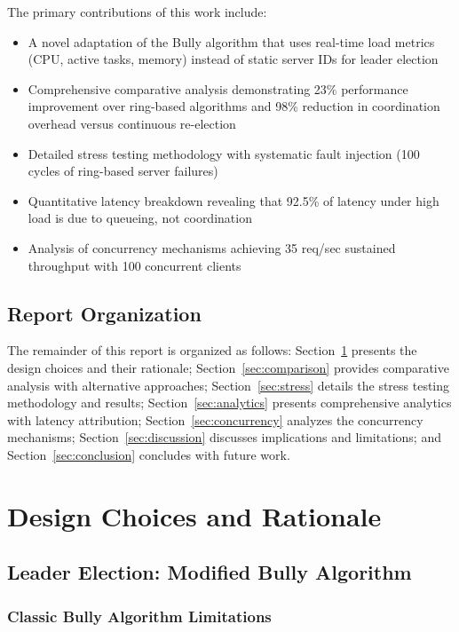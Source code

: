 \documentclass[12pt,a4paper]{article}
\begin{document}
The primary contributions of this work include:

\begin{itemize}[leftmargin=*]
    \item A novel adaptation of the Bully algorithm that uses real-time load metrics (CPU, active tasks, memory) instead of static server IDs for leader election
    \item Comprehensive comparative analysis demonstrating 23\% performance improvement over ring-based algorithms and 98\% reduction in coordination overhead versus continuous re-election
    \item Detailed stress testing methodology with systematic fault injection (100 cycles of ring-based server failures)
    \item Quantitative latency breakdown revealing that 92.5\% of latency under high load is due to queueing, not coordination
    \item Analysis of concurrency mechanisms achieving 35 req/sec sustained throughput with 100 concurrent clients
\end{itemize}

\subsection{Report Organization}

The remainder of this report is organized as follows: Section~\ref{sec:design} presents the design choices and their rationale; Section~\ref{sec:comparison} provides comparative analysis with alternative approaches; Section~\ref{sec:stress} details the stress testing methodology and results; Section~\ref{sec:analytics} presents comprehensive analytics with latency attribution; Section~\ref{sec:concurrency} analyzes the concurrency mechanisms; Section~\ref{sec:discussion} discusses implications and limitations; and Section~\ref{sec:conclusion} concludes with future work.

\newpage

\section{Design Choices and Rationale}
\label{sec:design}

\subsection{Leader Election: Modified Bully Algorithm}

\subsubsection{Classic Bully Algorithm Limitations}
\end{document}
